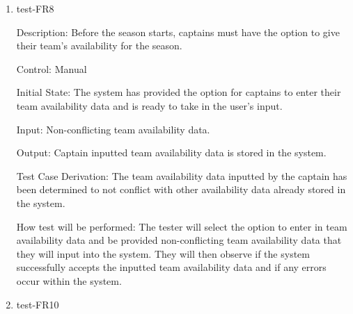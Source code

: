 \documentclass[12pt, titlepage]{article}
\begin{document}
\begin{enumerate}

  \item{test-FR8\\}
  
  Description: Before the season starts, captains must have the
  option to give their team’s availability for the season.

  Control: Manual

  Initial State: The system has provided the option for captains to enter their team
  availability data and is ready to take in the user's input.

  Input: Non-conflicting team availability data.

  Output: Captain inputted team availability data is stored in the system.

  Test Case Derivation: The team availability data inputted by the captain has been
  determined to not conflict with other availability data already stored in the system.

  How test will be performed: The tester will select the option to enter in team 
  availability data and be provided non-conflicting team availability
  data that they will input into the system. They will then observe if the system successfully
  accepts the inputted team availability data and if any errors occur within the system.








  \item{test-FR10\\}
  

\end{enumerate}
\end{document}
